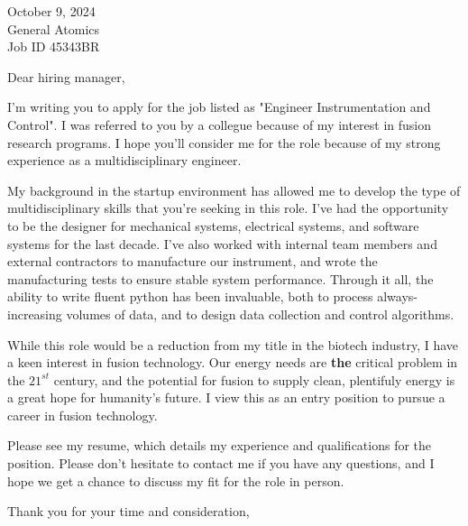 \documentclass[a4paper, 10pt]{letter}
\begin{document}
\begin{letter}
{
    October 9, 2024\\
    General Atomics\\
    Job ID 45343BR
}

\opening{Dear hiring manager,}

I'm writing you to apply for the job listed as "Engineer Instrumentation and Control".  I was referred to you by a collegue because of my interest in fusion
research programs. I hope you'll consider me for the role because of my strong experience as a multidisciplinary engineer.

My background in the startup environment has allowed me to develop the type of multidisciplinary skills that you're seeking in this role. 
I've had the opportunity to be the designer for mechanical systems, electrical systems, and software systems for the last decade. 
I've also worked with internal team members and external contractors to manufacture our instrument, and wrote the manufacturing tests to 
ensure stable system performance. Through it all, the ability to write fluent python has been invaluable, both to process always-increasing
volumes of data, and to design data collection and control algorithms. 

While this role would be a reduction from my title in the biotech industry, I have a keen interest in fusion technology. Our energy needs are \textbf{the}
critical problem in the $21^{st}$ century, and the potential for fusion to supply clean, plentifuly energy is a great hope for humanity's future. I
view this as an entry position to pursue a career in fusion technology. 

Please see my resume, which details my experience and qualifications for the position. Please don't hesitate to contact me if you have any questions, and I hope we 
get a chance to discuss my fit for the role in person. 

\closing{Thank you for your time and consideration,}

\end{letter}
\end{document}
